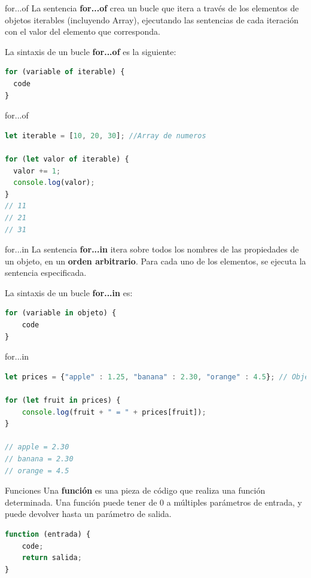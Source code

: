 \documentclass{beamer}
\begin{document}
\begin{frame}[fragile]{for...of}
La sentencia \textbf{for...of} crea un bucle que itera a través de los elementos de objetos iterables (incluyendo Array), ejecutando las sentencias de cada iteración con el valor del elemento que corresponda.\newline

La sintaxis de un bucle \textbf{for...of} es la siguiente:
\begin{lstlisting}[language=JavaScript]
for (variable of iterable) {
  code
}
\end{lstlisting}
\end{frame}

\begin{frame}[fragile]{for...of}
\begin{lstlisting}[language=JavaScript]
let iterable = [10, 20, 30]; //Array de numeros

for (let valor of iterable) {
  valor += 1;
  console.log(valor);
}
// 11
// 21
// 31
\end{lstlisting}
\end{frame}

\begin{frame}[fragile]{for...in}
La sentencia \textbf{for...in} itera sobre todos los nombres de las propiedades de un objeto, en un \textbf{orden arbitrario}. Para cada uno de los elementos, se ejecuta la sentencia especificada.

La sintaxis de un bucle \textbf{for...in} es:
\begin{lstlisting}[language=JavaScript]
for (variable in objeto) {
    code
}
\end{lstlisting}
\end{frame}

\begin{frame}[fragile]{for...in}
\begin{lstlisting}[language=JavaScript]
let prices = {"apple" : 1.25, "banana" : 2.30, "orange" : 4.5}; // Objeto

for (let fruit in prices) {
    console.log(fruit + " = " + prices[fruit]);
}

// apple = 2.30
// banana = 2.30 
// orange = 4.5 


\end{lstlisting}
\end{frame}

\begin{frame}[fragile]{Funciones}
Una \textbf{función} es una pieza de código que realiza una función determinada. Una función puede tener de 0 a múltiples parámetros de entrada, y puede devolver hasta un parámetro de salida.
\begin{lstlisting}[language=JavaScript]
function (entrada) {
    code;
    return salida;
}
\end{lstlisting}
\end{frame}
\end{document}
